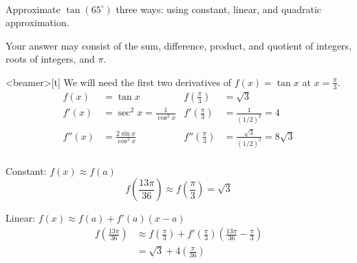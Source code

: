 \begin{frame}[t]
\hfill\hyperlink{end3.4.7}{}\\[1em]
\AnswerSpace{}
Approximate $\tan(65^\circ)$ three ways: using constant, linear, and quadratic approximation.

Your answer may consist of the sum, difference, product, and quotient of integers, roots of integers, and $\pi$.
\vfill
{}
\end{frame}
\begin{frame}<beamer>[t]
\color{answercolor}
We will need the first two derivatives of $f(x)=\tan x$ at $x=\frac{\pi}{3}$.
\begin{align*}
f(x)&=\tan x & f\left(\frac\pi3\right)&=\sqrt 3\\
f'(x)&=\sec^2 x  = \frac{1}{\cos^2 x}& f'\left(\frac\pi3\right)&=\frac{1}{(1/2)^2} = 4\\
f''(x)&=\frac{2\sin x}{\cos^3 x} &  f''\left(\frac\pi3\right)&=\frac{\sqrt 3}{(1/2)^3} = 8\sqrt 3\\
\end{align*}

Constant: $f(x) \approx f(a)$
\[f\left( \frac{13\pi}{36}\right) \approx f\left( \frac{\pi}{3}\right)=\sqrt 3
\]

Linear: $f(x) \approx f(a)+f'(a)(x-a)$
\begin{align*}
f\left( \frac{13\pi}{36}\right) &\approx f\left( \frac{\pi}{3}\right)+f'\left( \frac{\pi}{3}\right)\left( \frac{13\pi}{36}- \frac{\pi}{3}\right)\\
&=\sqrt 3+4\left(\frac{\pi}{36}\right)
\end{align*}
\end{frame}

